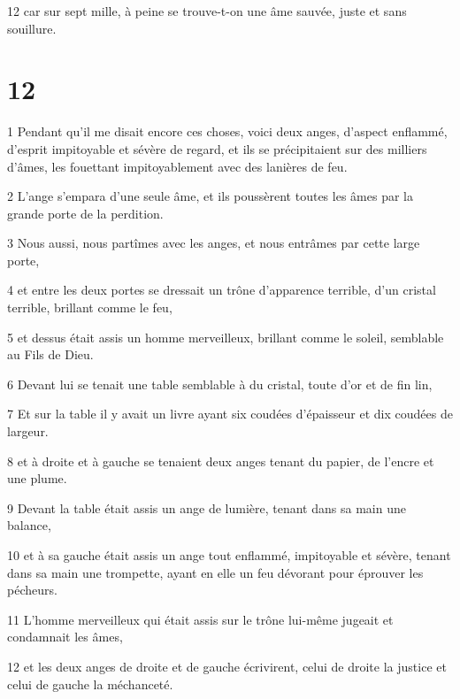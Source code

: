 \par 12 car sur sept mille, à peine se trouve-t-on une âme sauvée, juste et sans souillure.

\chapter{12}

\par 1 Pendant qu'il me disait encore ces choses, voici deux anges, d'aspect enflammé, d'esprit impitoyable et sévère de regard, et ils se précipitaient sur des milliers d'âmes, les fouettant impitoyablement avec des lanières de feu.

\par 2 L'ange s'empara d'une seule âme, et ils poussèrent toutes les âmes par la grande porte de la perdition.

\par 3 Nous aussi, nous partîmes avec les anges, et nous entrâmes par cette large porte,

\par 4 et entre les deux portes se dressait un trône d'apparence terrible, d'un cristal terrible, brillant comme le feu,

\par 5 et dessus était assis un homme merveilleux, brillant comme le soleil, semblable au Fils de Dieu.

\par 6 Devant lui se tenait une table semblable à du cristal, toute d'or et de fin lin,

\par 7 Et sur la table il y avait un livre ayant six coudées d'épaisseur et dix coudées de largeur.

\par 8 et à droite et à gauche se tenaient deux anges tenant du papier, de l'encre et une plume.

\par 9 Devant la table était assis un ange de lumière, tenant dans sa main une balance,

\par 10 et à sa gauche était assis un ange tout enflammé, impitoyable et sévère, tenant dans sa main une trompette, ayant en elle un feu dévorant pour éprouver les pécheurs.

\par 11 L'homme merveilleux qui était assis sur le trône lui-même jugeait et condamnait les âmes,

\par 12 et les deux anges de droite et de gauche écrivirent, celui de droite la justice et celui de gauche la méchanceté.

